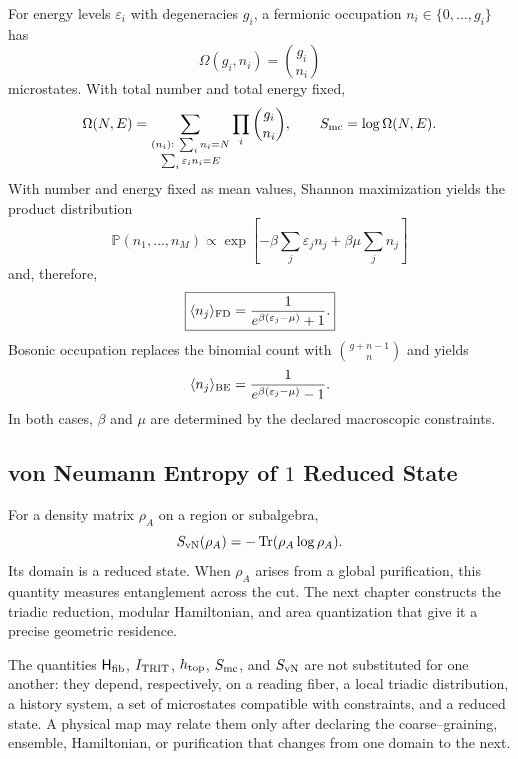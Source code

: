 For energy levels \(\varepsilon_i\) with degeneracies \(g_i\), a
fermionic occupation \(n_i\in\{0,\ldots,g_i\}\) has
\[
 \Omega(g_i,n_i)=\binom{g_i}{n_i}
\]
microstates. With total number and total energy fixed,
\begin{equation}
 \Omega(N,E)=
 \sum_{\substack{(n_i):\ \sum_i n_i=N\\
                         \sum_i\varepsilon_i n_i=E}}
 \prod_i\binom{g_i}{n_i},
 \qquad
 S_{\rm mc}=\log\Omega(N,E).
 \label{eq:entropia-microcanonica-anexo}
\end{equation}
With number and energy fixed as mean values, Shannon maximization
\cite{Shannon1948} yields
the product distribution
\[
 \mathbb P(n_1,\ldots,n_M)
 \propto
 \exp\!\left[-\beta\sum_j\varepsilon_jn_j
              +\beta\mu\sum_j n_j\right]
\]
and, therefore,
\begin{equation}
 \boxed{
 \langle n_j\rangle_{\rm FD}
 =\frac{1}{e^{\beta(\varepsilon_j-\mu)}+1}.}
 \label{eq:fermi-dirac-entropia-anexo}
\end{equation}
Bosonic occupation replaces the binomial count with
\(\binom{g+n-1}{n}\) and yields
\[
 \langle n_j\rangle_{\rm BE}
 =\frac{1}{e^{\beta(\varepsilon_j-\mu)}-1}.
\]
In both cases, \(\beta\) and \(\mu\) are determined by the declared
macroscopic constraints.

\subsection{von Neumann Entropy of \(1\) Reduced State}

For a density matrix \(\rho_A\) on a region or subalgebra,
\[
 S_{\rm vN}(\rho_A)=-\operatorname{Tr}(\rho_A\log\rho_A).
\]
Its domain is a reduced state. When \(\rho_A\) arises from a
global purification, this quantity measures entanglement across the cut.
The next chapter constructs the triadic reduction, modular Hamiltonian,
and area quantization that give it a precise geometric residence.

\begin{proposition}
\label{prop:cinco-entropias-tipadas}
The quantities \(\mathsf H_{\rm fib}\), \(I_{\rm TRIT}\), \(h_{\rm top}\),
\(S_{\rm mc}\), and \(S_{\rm vN}\) are not substituted for one another: they depend,
respectively, on a reading fiber, a local triadic distribution, a
history system, a set of microstates compatible with constraints,
and a reduced state. A physical map may relate them only after
declaring the coarse--graining, ensemble, Hamiltonian, or purification
that changes from one domain to the next.
\end{proposition}

